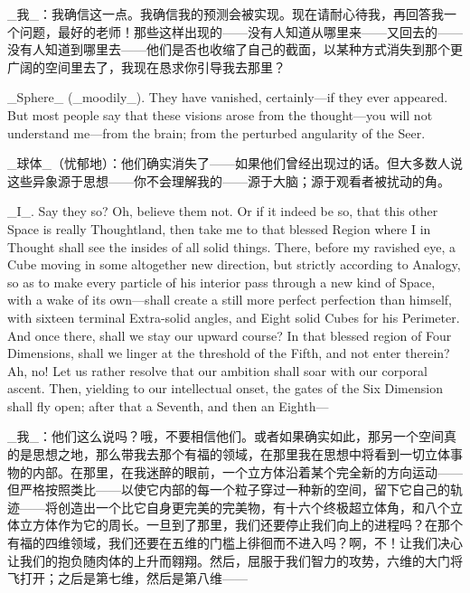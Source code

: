 \documentclass[12pt,UTF8]{ctexbook}
\begin{document}
\_我\_：我确信这一点。我确信我的预测会被实现。现在请耐心待我，再回答我一个问题，最好的老师！那些这样出现的——没有人知道从哪里来——又回去的——没有人知道到哪里去——他们是否也收缩了自己的截面，以某种方式消失到那个更广阔的空间里去了，我现在恳求你引导我去那里？

\_Sphere\_ (\_moodily\_). They have vanished, certainly---if they ever appeared. But most people say that these visions arose from the thought---you will not understand me---from the brain; from the perturbed angularity of the Seer.

\_球体\_（忧郁地）：他们确实消失了——如果他们曾经出现过的话。但大多数人说这些异象源于思想——你不会理解我的——源于大脑；源于观看者被扰动的角。

\_I\_. Say they so? Oh, believe them not. Or if it indeed be so, that this other Space is really Thoughtland, then take me to that blessed Region where I in Thought shall see the insides of all solid things. There, before my ravished eye, a Cube moving in some altogether new direction, but strictly according to Analogy, so as to make every particle of his interior pass through a new kind of Space, with a wake of its own---shall create a still more perfect perfection than himself, with sixteen terminal Extra-solid angles, and Eight solid Cubes for his Perimeter. And once there, shall we stay our upward course? In that blessed region of Four Dimensions, shall we linger at the threshold of the Fifth, and not enter therein? Ah, no! Let us rather resolve that our ambition shall soar with our corporal ascent. Then, yielding to our intellectual onset, the gates of the Six Dimension shall fly open; after that a Seventh, and then an Eighth---

\_我\_：他们这么说吗？哦，不要相信他们。或者如果确实如此，那另一个空间真的是思想之地，那么带我去那个有福的领域，在那里我在思想中将看到一切立体事物的内部。在那里，在我迷醉的眼前，一个立方体沿着某个完全新的方向运动——但严格按照类比——以使它内部的每一个粒子穿过一种新的空间，留下它自己的轨迹——将创造出一个比它自身更完美的完美物，有十六个终极超立体角，和八个立体立方体作为它的周长。一旦到了那里，我们还要停止我们向上的进程吗？在那个有福的四维领域，我们还要在五维的门槛上徘徊而不进入吗？啊，不！让我们决心让我们的抱负随肉体的上升而翱翔。然后，屈服于我们智力的攻势，六维的大门将飞打开；之后是第七维，然后是第八维——
\end{document}
